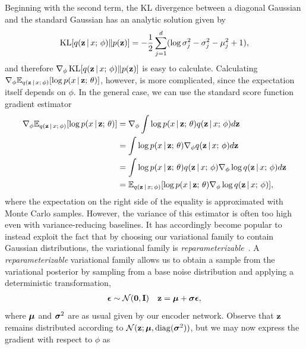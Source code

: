 \documentclass{article}
\begin{document}
Beginning with the second term, the KL divergence between a diagonal Gaussian and the standard Gaussian has an analytic solution given by
\[\operatorname*{KL}[q(\mathbf{z} \,|\, x ; \, \phi) \Vert p(\mathbf{z})]  = -\frac{1}{2}\sum_{j=1}^d (\log \sigma^2_j - \sigma^2_j - \mu_j^2 + 1), \]
and therefore $\nabla_\phi \operatorname*{KL}[q(\mathbf{z} \,|\, x ; \, \phi)  \Vert  p(\mathbf{z})]$ is easy to calculate.
Calculating $\nabla_\phi \mathbb{E}_{q(\mathbf{z} \,|\, x ; \, \phi)} [ \log p(x \,|\, \mathbf{z} ; \, \theta)]$, however, is more complicated, since the expectation itself depends on $\phi$. In the general case, we can use the standard score function gradient estimator  \citep{Glynn1987,Williams1992,Fu2006}
\begin{align*}
\nabla_\phi \mathbb{E}_{q(\mathbf{z} \,|\, x ; \, \phi)} [ \log p(x \,|\, \mathbf{z} ; \, \theta)] &= 
\nabla_\phi \int  \log p(x \,|\, \mathbf{z} ; \, \theta) q(\mathbf{z} \,|\, x ; \, \phi) d\mathbf{z} \\
&= 
\int  \log p(x \,|\, \mathbf{z} ; \, \theta) \nabla_\phi  q(\mathbf{z} \,|\, x ; \, \phi) d\mathbf{z} \\
&= 
\int  \log p(x \,|\, \mathbf{z} ; \, \theta)   q(\mathbf{z} \,|\, x ; \, \phi)\nabla_\phi  \log q(\mathbf{z} \,|\, x ; \, \phi) d\mathbf{z} \\
&=\mathbb{E}_{q(\mathbf{z} \,|\, x ; \, \phi)} [\log p(x \,|\, \mathbf{z} ; \, \theta)\nabla_\phi \log q(\mathbf{z} \,|\, x ; \, \phi)],
\end{align*}
where the expectation on the right side of the equality is approximated with Monte Carlo samples. However, the variance of this estimator is often too high even with variance-reducing baselines. It has accordingly become popular to instead exploit the fact that by choosing our variational family to contain Gaussian distributions, the variational family is \emph{reparameterizable}~\citep{Kingma2014,Rezende2014,glasserman2013monte}. %
A \emph{reparameterizable} variational family allows us to obtain a sample from the variational posterior by sampling from a base noise distribution and applying a deterministic transformation, 
\begin{align*} 
\boldsymbol{\epsilon} \sim \mathcal{N}(\mathbf{0}, \mathbf{I}) &&
\mathbf{z} = \boldsymbol{\mu} + \boldsymbol{\sigma} \boldsymbol{\epsilon},
\end{align*}
where $\boldsymbol{\mu}$ and $\boldsymbol{\sigma}^2$ are as usual given by our encoder network. Observe that $\mathbf{z}$ remains distributed according to $\mathcal{N}(\mathbf{z}; \boldsymbol{\mu}, \mathrm{diag}(\boldsymbol{\sigma}^2))$, but 
we may now express the gradient with respect to $\phi$ as
\end{document}
